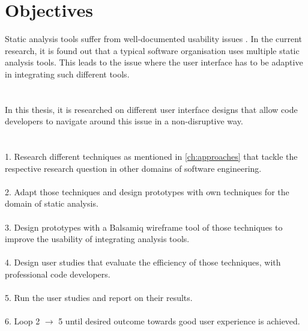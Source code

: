 \chapter{Objectives}
\label{ch:objectives}

Static analysis tools suffer from well-documented usability issues \cite{CB16,JSMB13}. In the current research, it is found out that a typical software organisation uses multiple static analysis tools. This leads to the issue where the user interface has to be adaptive in integrating such different tools. \\ \\ \\
In this thesis, it is researched on different user interface designs that allow code developers to navigate around
this issue in a non-disruptive way. \\ \\ \\
1. Research different techniques as mentioned in \autoref{ch:approaches} that tackle the respective research question in other domains of software
engineering. \\ \\
2. Adapt those techniques and design prototypes with own techniques for the domain of static analysis. \\ \\
3. Design prototypes with a Balsamiq wireframe tool \cite{B} of those techniques to improve the usability of integrating analysis tools. \\ \\
4. Design user studies that evaluate the efficiency of those techniques, with professional code developers. \\ \\
5. Run the user studies and report on their results. \\ \\
6. Loop 2 $\rightarrow$ 5 until desired outcome towards good user experience is achieved.

\let\cleardoublepage\clearpage